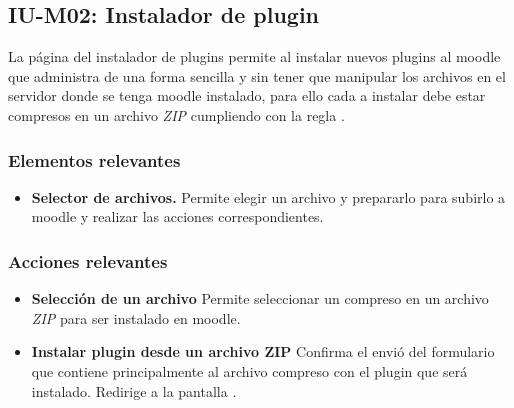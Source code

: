 
\subsection{IU-M02: Instalador de plugin}

 La página del instalador de plugins permite al  instalar nuevos plugins al 
 moodle que administra de una forma sencilla y sin tener que manipular los archivos en el servidor
 donde se tenga moodle instalado, para ello cada  a instalar debe estar
 compresos en un archivo {\it ZIP} cumpliendo con la regla .


\subsubsection{Elementos relevantes}

    \begin{itemize}
    \item {\bf Selector de archivos.}
        Permite elegir un archivo y prepararlo para subirlo a moodle
        y realizar las acciones correspondientes.
    \end{itemize}

\subsubsection{Acciones relevantes}

    \begin{itemize}
    \item {\bf Selección de un archivo}
        Permite seleccionar un  compreso en un archivo {\it ZIP} para
        ser instalado en moodle.

    \item {\bf Instalar plugin desde un archivo ZIP}
        Confirma el envió del formulario que contiene principalmente al archivo compreso con 
        el plugin que será instalado. Redirige a la pantalla .
    \end{itemize}

\clearpage
